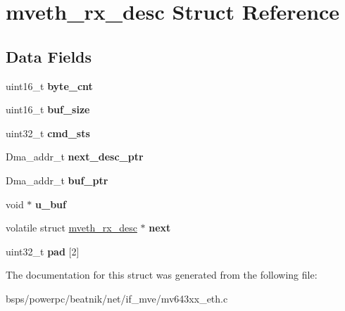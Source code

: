 \hypertarget{structmveth__rx__desc}{}\section{mveth\+\_\+rx\+\_\+desc Struct Reference}
\label{structmveth__rx__desc}
\subsection*{Data Fields}
\begin{DoxyCompactItemize}
\item 
\mbox{\label{structmveth__rx__desc_aad92a0d4c5e0c4feb54f5efadd321d1f}} 
uint16\+\_\+t {\bfseries byte\+\_\+cnt}
\item 
\mbox{\label{structmveth__rx__desc_a58efa87187c7316e473f7196054f8438}} 
uint16\+\_\+t {\bfseries buf\+\_\+size}
\item 
\mbox{\label{structmveth__rx__desc_a36250ca0b10d49ae8b59f41be62e9288}} 
uint32\+\_\+t {\bfseries cmd\+\_\+sts}
\item 
\mbox{\label{structmveth__rx__desc_ac7a074ef12550b1cfdb58fd31d51ab0d}} 
Dma\+\_\+addr\+\_\+t {\bfseries next\+\_\+desc\+\_\+ptr}
\item 
\mbox{\label{structmveth__rx__desc_ae7316b3925e51aa3bd77556d83295daf}} 
Dma\+\_\+addr\+\_\+t {\bfseries buf\+\_\+ptr}
\item 
\mbox{\label{structmveth__rx__desc_add861ec457c8b660f06e53f6143f4ebb}} 
void $\ast$ {\bfseries u\+\_\+buf}
\item 
\mbox{\label{structmveth__rx__desc_aad5bea2f25e4c06aeb7dad3d974dee1b}} 
volatile struct \mbox{\hyperlink{structmveth__rx__desc}{mveth\+\_\+rx\+\_\+desc}} $\ast$ {\bfseries next}
\item 
\mbox{\label{structmveth__rx__desc_ae99f5c161bf7c663661740e107094f65}} 
uint32\+\_\+t {\bfseries pad} \mbox{[}2\mbox{]}
\end{DoxyCompactItemize}


The documentation for this struct was generated from the following file\+:\begin{DoxyCompactItemize}
\item 
bsps/powerpc/beatnik/net/if\+\_\+mve/mv643xx\+\_\+eth.\+c\end{DoxyCompactItemize}
